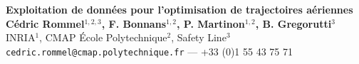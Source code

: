 \documentclass[a0,portrait]{a0poster}
\begin{document}


\begin{minipage}[b]{0.75\linewidth}
\veryHuge \color{Navy} \textbf{Exploitation de données pour l'optimisation de trajectoires aériennes} \color{Black}\\[2cm] %
\huge \textbf{Cédric Rommel$^{1,2,3}$, F. Bonnans$^{1,2}$, P. Martinon$^{1,2}$, B. Gregorutti$^3$}\\[0.5cm] %
\huge INRIA$^1$, CMAP École Polytechnique$^2$, Safety Line$^3$\\[0.4cm] %
\Large \texttt{cedric.rommel@cmap.polytechnique.fr} --- +33 (0)1 55 43 75 71 \\
\end{minipage}
%
\begin{minipage}[b]{0.25\linewidth}

\begin{center}
\end{center}
\end{minipage}

\vspace{1cm} %

\end{document}
